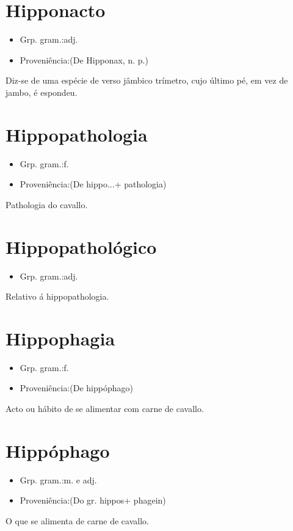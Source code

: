 \documentclass{article}
\begin{document}
\section{Hipponacto}
\begin{itemize}
\item {Grp. gram.:adj.}
\end{itemize}
\begin{itemize}
\item {Proveniência:(De \textunderscore Hipponax\textunderscore , n. p.)}
\end{itemize}
Diz-se de uma espécie de verso jâmbico trímetro, cujo último pé, em vez de jambo, é espondeu.
\section{Hippopathologia}
\begin{itemize}
\item {Grp. gram.:f.}
\end{itemize}
\begin{itemize}
\item {Proveniência:(De \textunderscore hippo...\textunderscore  + \textunderscore pathologia\textunderscore )}
\end{itemize}
Pathologia do cavallo.
\section{Hippopathológico}
\begin{itemize}
\item {Grp. gram.:adj.}
\end{itemize}
Relativo á hippopathologia.
\section{Hippophagia}
\begin{itemize}
\item {Grp. gram.:f.}
\end{itemize}
\begin{itemize}
\item {Proveniência:(De \textunderscore hippóphago\textunderscore )}
\end{itemize}
Acto ou hábito de se alimentar com carne de cavallo.
\section{Hippóphago}
\begin{itemize}
\item {Grp. gram.:m.  e  adj.}
\end{itemize}
\begin{itemize}
\item {Proveniência:(Do gr. \textunderscore hippos\textunderscore  + \textunderscore phagein\textunderscore )}
\end{itemize}
O que se alimenta de carne de cavallo.
\end{document}
